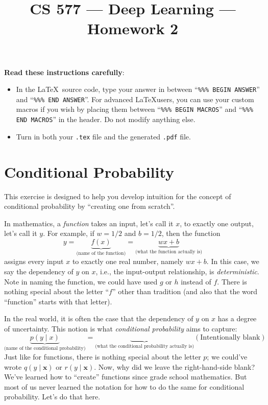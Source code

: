\documentclass{article}
\title{CS 577 --- Deep Learning --- Homework 2}
\author{}
\date{}
\newcommand{\mypart}[2]{\noindent{\textbf{[#1] point(s) --- #2:}}}
\begin{document}
\maketitle
\textbf{Read these instructions carefully}:
\begin{itemize}
  \item
In the \LaTeX~source code, type your answer in between
``\verb|%%% BEGIN ANSWER|'' and
``\verb|%%% END ANSWER|''.
        For advanced \LaTeX users,
        you can use your custom macros if you wish
        by placing them
        between
``\verb|%%% BEGIN MACROS|'' and
``\verb|%%% END MACROS|'' in the header.
        Do not modify anything else.




  \item Turn in both your \verb|.tex| file and the generated \verb|.pdf| file.
\end{itemize}



\section{Conditional Probability}
\mypart{3}{part a}
This exercise is designed to help you develop intuition for the concept of  conditional probability by ``creating one from scratch''.

In mathematics, a \emph{function} takes an input, let's call it \(x\), to exactly one output, let's call it \(y\).
For example, if
\({w} =
1/2
\)
and \(b = 1/2\), then the function
\begin{equation}
  \label{equation:function-with-description}
  y=
\underbrace{f({x})}_{\mbox{(name of the function)}} = \underbrace{w x + b}_{\mbox{(what the function actually is)}}
\end{equation}
assigns every input \(x\) to exactly one real number, namely \(wx + b\).
In this case, we say the  dependency of \(y\) on \(x\), i.e., the input-output relationship, is \emph{deterministic}.
Note in naming the function, we could have used \(g\) or \(h\) instead of \(f\).
There is nothing special about the letter ``\(f\)'' other than tradition (and also that the word ``function'' starts with that letter).

In the real world, it is often the case that
the dependency of \(y\) on \(x\) has a degree of uncertainty.
This notion is what \emph{conditional probability} aims to capture:
\begin{equation*}
  \underbrace{
    p(y\mid {x})
  }_{\mbox{(name of the conditional probability)}}
  =
  \underbrace{
    \qquad \qquad
  }_{\mbox{(what the conditional probability actually is)}}
  (\mbox{Intentionally blank})
\end{equation*}
Just like for functions, there is nothing special about the letter \(p\); we could've wrote \(q(y\mid \mathbf{x})\) or \(r(y \mid \mathbf{x})\).
Now, why did we leave the right-hand-side blank? We've learned how to ``create'' functions since grade school mathematics. But most of us never learned the notation for how to do the same for conditional probability.
Let's do that here.
\end{document}
